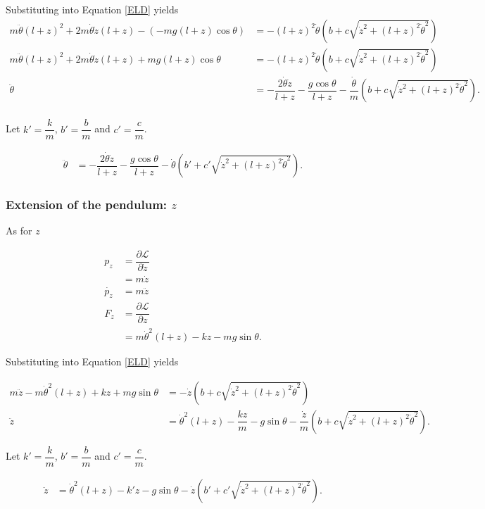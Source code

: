 \documentclass[12pt,a4paper,portrait]{article}
\newcommand{\lag}{\mathcal{L}}
\newcommand{\eq}[1]{Equation \eqref{#1}}
\begin{document}
Substituting into \eq{ELD} yields
\begin{align*}
	m\ddot{\theta} (l+z)^2 + 2m\dot{\theta}\dot{z}(l+z) - (-mg(l+z)\cos{\theta}) &= -(l+z)^2 \dot{\theta} \left(b+c\sqrt{\dot{z}^2+(l+z)^2\dot{\theta}^2}\right) \\
	m\ddot{\theta} (l+z)^2 + 2m\dot{\theta}\dot{z}(l+z) +mg(l+z)\cos{\theta} &= -(l+z)^2 \dot{\theta} \left(b+c\sqrt{\dot{z}^2+(l+z)^2\dot{\theta}^2}\right) \\
	\ddot{\theta} &= -\dfrac{2\dot{\theta}\dot{z}}{l+z} - \dfrac{g\cos{\theta}}{l+z} -\dfrac{\dot{\theta}}{m} \left(b+c\sqrt{\dot{z}^2+(l+z)^2\dot{\theta}^2}\right). \\
\end{align*}

Let $k'=\dfrac{k}{m}$, $b'=\dfrac{b}{m}$ and $c'=\dfrac{c}{m}$.

\begin{align*}
	\ddot{\theta} &= -\dfrac{2\dot{\theta}\dot{z}}{l+z} - \dfrac{g\cos{\theta}}{l+z} -\dot{\theta} \left(b'+c'\sqrt{\dot{z}^2+(l+z)^2\dot{\theta}^2}\right).
\end{align*}

\subsubsection{Extension of the pendulum: $z$}
As for $z$

\begin{align*}
	p_z &= \dfrac{\partial \lag}{\partial \dot{z}} \\
	&= m\dot{z} \\
	\dot{p_z} &= m\ddot{z} \\
	F_z &= \dfrac{\partial \lag}{\partial z} \\
	&= m\dot{\theta}^2(l+z) - kz - mg\sin{\theta}.
\end{align*}

Substituting into \eq{ELD} yields

\begin{align*}
	m\ddot{z} - m\dot{\theta}^2(l+z) + kz + mg\sin{\theta} &= -\dot{z}\left(b+c\sqrt{\dot{z}^2+(l+z)^2\dot{\theta}^2}\right) \\
	\ddot{z} &= \dot{\theta}^2(l+z) - \dfrac{kz}{m} - g\sin{\theta} -\dfrac{\dot{z}}{m}\left(b+c\sqrt{\dot{z}^2+(l+z)^2\dot{\theta}^2}\right).
\end{align*}

Let $k'=\dfrac{k}{m}$, $b'=\dfrac{b}{m}$ and $c'=\dfrac{c}{m}$.

\begin{align*}
	\ddot{z} &= \dot{\theta}^2(l+z) - k'z - g\sin{\theta} -\dot{z}\left(b'+c'\sqrt{\dot{z}^2+(l+z)^2\dot{\theta}^2}\right).
\end{align*}
\end{document}
